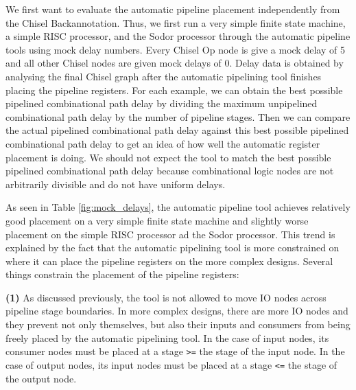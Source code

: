 
We first want to evaluate the automatic pipeline placement independently from the Chisel Backannotation. Thus, we first run a very simple finite state machine, a simple RISC processor, and the Sodor processor through the automatic pipeline tools using mock delay numbers. Every Chisel Op node is give a mock delay of 5 and all other Chisel nodes are given mock delays of 0. Delay data is obtained by analysing the final Chisel graph after the automatic pipelining tool finishes placing the pipeline registers. For each example, we can obtain the best possible pipelined combinational path delay by dividing the maximum unpipelined combinational path delay by the number of pipeline stages. Then we can compare the actual pipelined combinational path delay against this best possible pipelined combinational path delay to get an idea of how well the automatic register placement is doing. We should not expect the tool to match the best possible pipelined combinational path delay because combinational logic nodes are not arbitrarily divisible and do not have uniform delays.

As seen in Table \ref{fig:mock_delays}, the automatic pipeline tool achieves relatively good  placement on a very simple finite state machine and slightly worse placement on the simple RISC processor ad the Sodor processor. This trend is explained by the fact that the automatic pipelining tool is more constrained on where it can place the pipeline registers on the more complex designs. Several things constrain the placement of the pipeline registers:

{\bf (1)} 
As discussed previously, the tool is not allowed to move IO nodes across pipeline stage boundaries. In more complex designs, there are more IO nodes and they prevent not only themselves, but also their inputs and consumers from being freely placed by the automatic pipelining tool. In the case of input nodes, its consumer nodes must be placed at a stage {\tt >=} the stage of the input node. In the case of output nodes, its input nodes must be placed at a stage {\tt <=} the stage of the output node.

